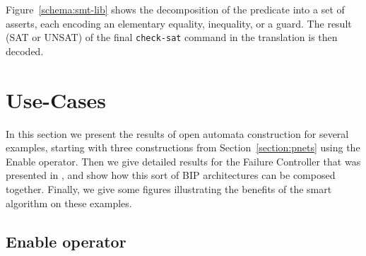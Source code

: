 \documentclass[smallcondensed]{svjour3}
\begin{document}
Figure~\ref{schema:smt-lib} shows the decomposition of the
predicate into a set of asserts, each encoding an elementary equality,
inequality, or a guard. 
The result (SAT or UNSAT) of the final \texttt{check-sat} command in
the translation is then decoded.

\section{Use-Cases}
\label{section:use-cases}
In this section we present the results of open automata construction
for several examples, starting with three constructions from
Section~\ref{section:pnets} using the Enable operator.
Then we give detailed results for the Failure Controller that was
presented in \cite{AVOCS18}, and show how this sort of BIP architectures
can be composed together.
Finally, we give some figures illustrating the benefits of the smart
algorithm on these examples.

\subsection{Enable operator} 
\label{section:use-case:Enable}
\end{document}
